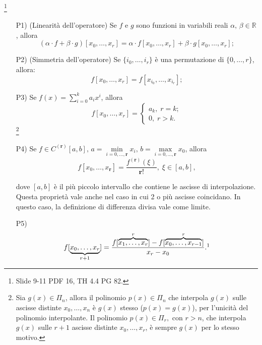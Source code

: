 \begin{property}
	\footnote{Slide 9-11 PDF 16, TH 4.4 PG 82.}
	\begin{itemize}
		\item[P1)](Linearità dell'operatore) Se $f$ e $g$ sono funzioni in variabili reali $\alpha,\,\beta \in\mathbb R$, allora
		\begin{equation*}
			(\alpha\cdot f + \beta\cdot g)[x_0,\hdots, x_r]=\alpha\cdot f[x_0,\hdots, x_r]+\beta\cdot g[x_0,\hdots, x_r];
		\end{equation*}
		\item[P2)](Simmetria dell'operatore) Se $\{i_0,\hdots,i_r\}$ è una permutazione di $\{0,\hdots, r\}$, allora:
		\begin{equation*}
			f[x_0,\hdots,x_r]=f[x_{i_0},\hdots,x_{i_r}];
		\end{equation*}
		\item[P3)] Se $f(x)=\sum_{i=0}^ka_ix^i$, allora 
		\begin{equation*}
					f[x_0,\hdots, x_r]=
				\begin{cases}
					a_k,\; r=k;\\
					0,\; r>k.
				\end{cases}
		\end{equation*}
		\footnote{Sia $g(x)\in\Pi_n$, allora il polinomio $p(x)\in\Pi_n$ che interpola $g(x)$ sulle ascisse distinte $x_0,\hdots,x_n$ è $g(x)$ stesso ($p(x)=g(x)$), per l'unicità del polinomio interpolante.
			Il polinomio $p(x)\in\Pi_r,$ con $r>n$, che interpola $g(x)$ sulle $r+1$ ascisse distinte $x_0, \hdots, x_r$, è sempre $g(x)$ per lo stesso motivo.}
		
		\item[P4)] Se $f\in C^{(\boldsymbol r)}[a,b],\, a=\underset{i=0,\hdots,\boldsymbol r}{\min}x_i,\, b=\underset{i=0,\hdots,\boldsymbol r}{\max}x_0$, allora
		\begin{equation}\label{eq:P4DiffDiv}
			f[x_0,\hdots, x_{\boldsymbol r}]=\frac{f^{(\boldsymbol r)}(\xi)}{\boldsymbol r!},\; \xi\in [a,b],
		\end{equation}
		
		dove $[a,b]$ è il più piccolo intervallo che contiene le ascisse di interpolazione. Questa proprietà vale anche nel caso in cui 2 o più ascisse coincidano. In questo caso, la definizione di differenza divisa vale come limite.
		
		\item[P5)] \begin{equation}\label{eq:P5_differenze_divise}
			f[\underbrace{x_0,\hdots,x_r}_{r+1}]=\frac{f[\overbrace{x_1,\hdots,x_r}^{r}]-f[\overbrace{x_0,\hdots,x_{r-1}}^{r}]}{x_r-x_0}.\footnotemark
		\end{equation}
	\end{itemize}
\end{property}

